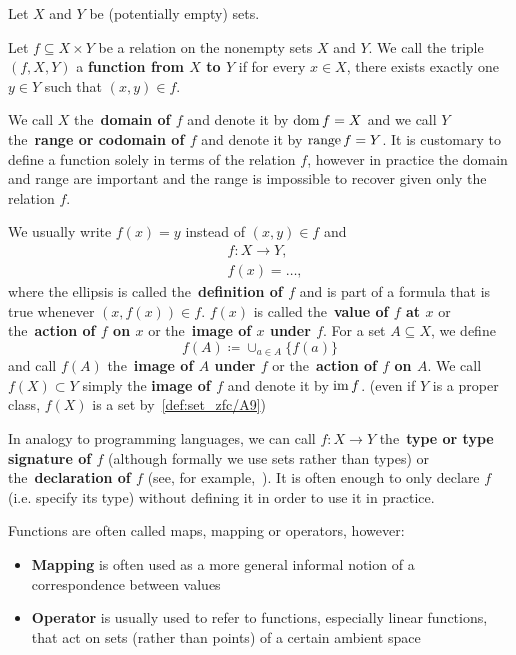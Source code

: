 \begin{definition}\label{def:function}
  Let \( X \) and \( Y \) be (potentially empty) sets.

  Let \( f \subseteq X \times Y \) be a relation on the nonempty sets \( X \) and \( Y \). We call the triple \( (f, X, Y) \) a \textbf{function from \( X \) to \( Y \)} if for every \( x \in X \), there exists exactly one \( y \in Y \) such that \( (x, y) \in f \).

  We call \( X \) the~\textbf{domain of \( f \)} and denote it by \( \operatorname{dom} f = X \) and we call \( Y \) the~\textbf{range or codomain of \( f \)} and denote it by \( \operatorname{range} f = Y \). It is customary to define a function solely in terms of the relation \( f \), however in practice the domain and range are important and the range is impossible to recover given only the relation \( f \).

  We usually write \( f(x) = y \) instead of \( (x, y) \in f \) and
  \begin{align*}
    &f: X \to Y, \\
    &f(x) = \ldots,
  \end{align*}
  where the ellipsis is called the~\textbf{definition of \( f \)} and is part of a formula that is true whenever \( (x, f(x)) \in f \). \( f(x) \) is called the~\textbf{value of \( f \) at \( x \)} or the~\textbf{action of \( f \) on \( x \)} or the~\textbf{image of \( x \) under \( f \)}. For a set \( A \subseteq X \), we define
  \begin{equation*}
    f(A) \coloneqq \cup_{a \in A} \{ f(a) \}
  \end{equation*}
  and call \( f(A) \) the~\textbf{image of \( A \) under \( f \)} or the~\textbf{action of \( f \) on \( A \)}. We call \( f(X) \subset Y \) simply the \textbf{image of \( f \)} and denote it by \( \operatorname{im} f \). (even if \( Y \) is a proper class, \( f(X) \) is a set by~\cref{def:set_zfc/A9})

  In analogy to programming languages, we can call \( f: X \to Y \) the~\textbf{type or type signature of \( f \)} (although formally we use sets rather than types) or the~\textbf{declaration of \( f \)} (see, for example,~\cite[section 2.4]{Kernighan1988}). It is often enough to only declare \( f \) (i.e. specify its type) without defining it in order to use it in practice.

  Functions are often called maps, mapping or operators, however:
  \begin{itemize}
    \item \textbf{Mapping} is often used as a more general informal notion of a correspondence between values
    \item \textbf{Operator} is usually used to refer to functions, especially linear functions, that act on sets (rather than points) of a certain ambient space
  \end{itemize}


\end{definition}
